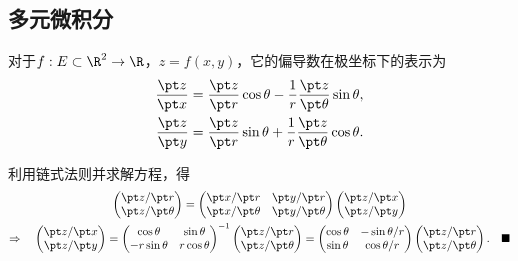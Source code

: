 
\subsection{多元微积分}

  \begin{thm}[偏导数的极坐标表示]
    \label{thm: 偏导数的极坐标表示}
    对于$f:E\subset\R^2\to\R$，$z=f(x,y)$，它的偏导数在极坐标下的表示为
    \[\begin{split}
      \frac{\pt z}{\pt x} &= \frac{\pt z}{\pt r}\cos\theta
        - \frac{1}{r}\frac{\pt z}{\pt\theta}\sin\theta,\\
      \frac{\pt z}{\pt y} &= \frac{\pt z}{\pt r}\sin\theta
       + \frac{1}{r}\frac{\pt z}{\pt\theta}\cos\theta.
    \end{split}\]
  \end{thm}
  \proof
    利用链式法则并求解方程，得
    \begin{gather*}
      \begin{pmatrix}
        \pt z/\pt r \\ \pt z/\pt \theta
      \end{pmatrix} =
      \begin{pmatrix}
        \pt x/\pt r & \pt y/\pt r \\
        \pt x/\pt \theta & \pt y/\pt\theta
      \end{pmatrix}
      \begin{pmatrix}
        \pt z/\pt x \\ \pt z/\pt y
      \end{pmatrix} \\
      \Rightarrow\quad
      \begin{pmatrix}
        \pt z/\pt x \\ \pt z/\pt y
      \end{pmatrix} =
      \begin{pmatrix}
        \cos\theta & \sin\theta \\
        -r\sin\theta & r\cos\theta
      \end{pmatrix}^{-1}
      \begin{pmatrix}
        \pt z/\pt r \\ \pt z/\pt \theta
      \end{pmatrix}=
      \begin{pmatrix}
        \cos\theta & -\sin\theta / r \\
        \sin\theta & \cos\theta / r
      \end{pmatrix}
      \begin{pmatrix}
        \pt z/\pt r \\ \pt z/\pt \theta
      \end{pmatrix}.\quad\blacksquare
    \end{gather*}

